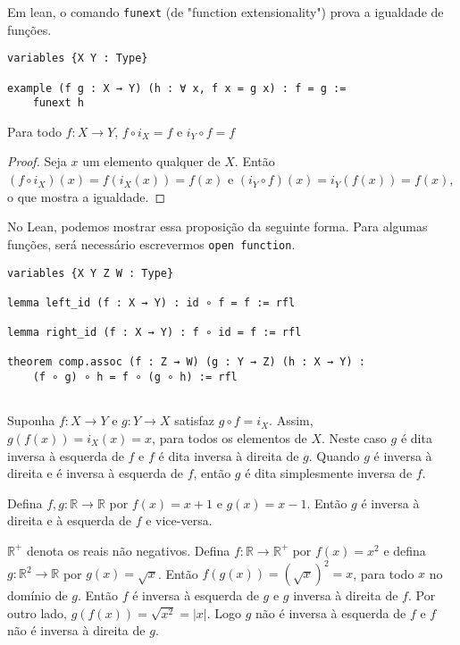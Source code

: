 Em lean, o comando \lstinline{funext} (de "function extensionality") prova a igualdade de funções.

\begin{lstlisting}
variables {X Y : Type}

example (f g : X → Y) (h : ∀ x, f x = g x) : f = g :=
    funext h
\end{lstlisting}

\begin{theorem}
    \label{prop1}
    Para todo $f: X \to Y$, $f \circ i_X = f$ e $i_Y \circ f = f$
\end{theorem}
\begin{proof}
    Seja $x$ um elemento qualquer de $X$. Então $(f \circ i_X)(x) = f(i_X(x)) = f(x)$
     e $(i_Y \circ f)(x) = i_Y(f(x)) = f(x)$, o que mostra a igualdade. 
\end{proof}

No Lean, podemos mostrar essa proposição da seguinte forma. Para algumas funções, será necessário
escrevermos \lstinline{open function}.   

\begin{lstlisting}
variables {X Y Z W : Type}

lemma left_id (f : X → Y) : id ∘ f = f := rfl

lemma right_id (f : X → Y) : f ∘ id = f := rfl

theorem comp.assoc (f : Z → W) (g : Y → Z) (h : X → Y) :
    (f ∘ g) ∘ h = f ∘ (g ∘ h) := rfl
  
\end{lstlisting}

\begin{definition}
    \label{def4}
    Suponha $f:X \to Y$ e $g : Y \to X$ satisfaz $g \circ f = i_X$. Assim, 
    $g(f(x)) = i_X(x) = x$, para todos os elementos de $X$. Neste caso $g$ é dita inversa à esquerda
    de $f$ e $f$ é dita inversa à direita de $g$. Quando $g$ é inversa à direita e é inversa à esquerda
    de $f$, então $g$ é dita simplesmente inversa de $f$. 
\end{definition}

\begin{example}
    \label{ex1}
    Defina $f,g : \mathbb{R} \to \mathbb{R}$ por $f(x) = x + 1$ e $g(x) = x - 1$. Então $g$ 
    é inversa à direita e à esquerda de $f$ e vice-versa.
\end{example}
\begin{example}
    \label{ex2}
    $\mathbb{R}^{+}$ denota os reais não negativos. Defina $f : \mathbb{R} \to \mathbb{R}^{+}$ 
    por $f(x) = x^2$ e defina $g : \mathbb{R}^2 \to \mathbb{R}$ por $g(x) = \sqrt{x}$. Então 
    $f(g(x)) = (\sqrt{x})^2 = x$, para todo $x$ no domínio de $g$. Então $f$ é inversa à esquerda de $g$
    e $g$ inversa à direita de $f$. Por outro lado, $g(f(x)) = \sqrt{x^2} = |x|$. Logo $g$ não é inversa à 
    esquerda de $f$ e $f$ não é inversa à direita de $g$. 
\end{example}

